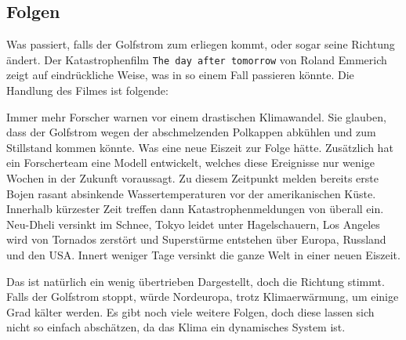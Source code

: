 \subsection{Folgen}

Was passiert, falls der Golfstrom zum erliegen kommt, oder sogar seine Richtung ändert.
Der Katastrophenfilm \texttt{The day after tomorrow} von Roland Emmerich zeigt auf eindrückliche Weise, was in so einem Fall passieren könnte. Die Handlung des Filmes ist folgende:

Immer mehr Forscher warnen vor einem drastischen Klimawandel. Sie glauben, dass der Golfstrom wegen der abschmelzenden Polkappen abkühlen und zum Stillstand kommen könnte. Was eine neue Eiszeit zur Folge hätte.
Zusätzlich hat ein Forscherteam eine Modell entwickelt, welches diese Ereignisse nur wenige Wochen in der Zukunft voraussagt. Zu diesem Zeitpunkt melden bereits erste Bojen rasant absinkende Wassertemperaturen vor der amerikanischen Küste. Innerhalb kürzester Zeit treffen dann Katastrophenmeldungen von überall ein. Neu-Dheli versinkt im Schnee, Tokyo leidet unter Hagelschauern, Los Angeles wird von Tornados zerstört und Superstürme entstehen über Europa, Russland und den USA. 
Innert weniger Tage versinkt die ganze Welt in einer neuen Eiszeit. 

Das ist natürlich ein wenig übertrieben Dargestellt, doch die Richtung stimmt. Falls der Golfstrom stoppt, würde Nordeuropa, trotz Klimaerwärmung, um einige Grad kälter werden. Es gibt noch viele weitere Folgen, doch diese lassen sich nicht so einfach abschätzen, da das Klima ein dynamisches System ist.

